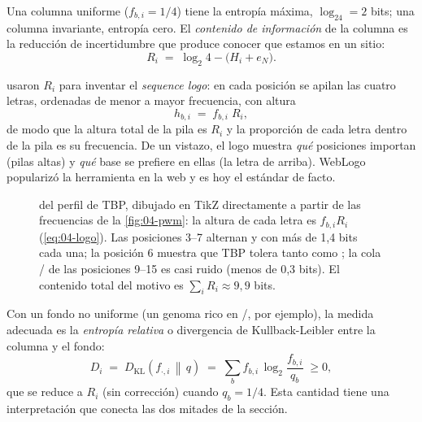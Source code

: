 \begin{simbolos}
\end{simbolos}

\noindent Una columna uniforme ($f_{b,i}=1/4$) tiene la entropía máxima, $\log_24=2$ bits; una columna invariante, entropía cero. El \emph{contenido de información} de la columna es la reducción de incertidumbre que produce conocer que estamos en un sitio:
\begin{equation}\label{eq:04-ic}
R_i \;=\; \log_2 4 - \big(H_i + e_N\big).
\end{equation}

\begin{simbolos}
\end{simbolos}

\noindent \textcite{c04-schneider1990} usaron $R_i$ para inventar el \emph{sequence logo}: en cada posición se apilan las cuatro letras, ordenadas de menor a mayor frecuencia, con altura
\begin{equation}\label{eq:04-logo}
h_{b,i} \;=\; f_{b,i}\;R_i,
\end{equation}
de modo que la altura total de la pila es $R_i$ y la proporción de cada letra dentro de la pila es su frecuencia. De un vistazo, el logo muestra \emph{qué} posiciones importan (pilas altas) y \emph{qué} base se prefiere en ellas (la letra de arriba). WebLogo \parencite{c04-crooks2004} popularizó la herramienta en la web y es hoy el estándar de facto.

\begin{figure}[tbp]
\centering

\caption[Sequence logo del sitio de TBP]{ del perfil de TBP, dibujado en TikZ directamente a partir de las frecuencias de la \cref{fig:04-pwm}: la altura de cada letra es $f_{b,i}R_i$ (\cref{eq:04-logo}). Las posiciones 3--7 alternan  y  con más de 1,4 bits cada una; la posición 6 muestra que TBP tolera tanto  como ; la cola / de las posiciones 9--15 es casi ruido (menos de 0,3 bits). El contenido total del motivo es $\sum_i R_i\approx 9{,}9$ bits.}
\label{fig:04-logo}
\end{figure}

Con un fondo no uniforme (un genoma rico en /, por ejemplo), la medida adecuada es la \emph{entropía relativa} o divergencia de Kullback-Leibler entre la columna y el fondo:
\begin{equation}\label{eq:04-kl}
D_i \;=\; D_{\mathrm{KL}}\!\left(f_{\cdot,i}\,\middle\|\,q\right) \;=\; \sum_b f_{b,i}\,\log_2\frac{f_{b,i}}{q_b}\;\ge 0,
\end{equation}
que se reduce a $R_i$ (sin corrección) cuando $q_b=1/4$. Esta cantidad tiene una interpretación que conecta las dos mitades de la sección.

